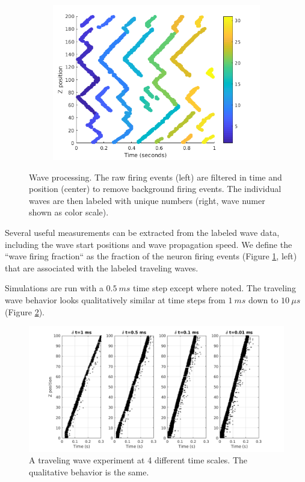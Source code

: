 \documentclass[a4paper,11pt]{article}
\begin{document}
\begin{figure}[!htb]
\begin{subfigure}{0.33\textwidth}
 \end{subfigure}%
 \begin{subfigure}{0.33\textwidth}
  \centering
  \includegraphics[width=\textwidth]{fig/2x2_wave_IDs}
 \end{subfigure}%
 \caption{Wave processing. The raw firing events (left) are filtered in time and position (center) to remove background firing events. The individual waves are then labeled with unique numbers (right, wave numer shown as color scale).}
 \label{fig:wave_analysis}
\end{figure}

Several useful measurements can be extracted from the labeled wave data, including the wave start positions and wave propagation speed.
We define the ``wave firing fraction`` as the fraction of the neuron firing events (Figure \ref{fig:wave_analysis}, left) that are associated with the labeled traveling waves.

Simulations are run with a $0.5~ms$ time step except where noted.
The traveling wave behavior looks qualitatively similar at time steps from $1~ms$ down to $10~\mu s$ (Figure \ref{fig:time_step}).
\begin{figure}[!htb]
 \centering
 \includegraphics[width=\textwidth]{fig/TimeStepEffect}
  \caption{A traveling wave experiment at 4 different time scales. The qualitative behavior is the same.}
 \label{fig:time_step}
\end{figure}
\end{document}
